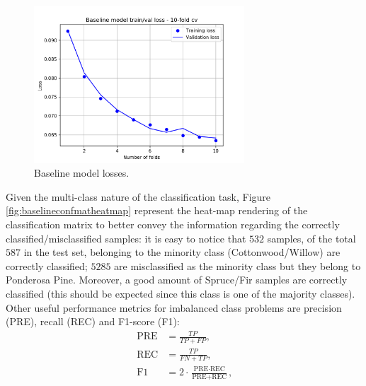 \begin{figure}
\centering
\includegraphics[width=0.7\textwidth]{./TeX_files/img/baselinemodelloss.png}
\caption{Baseline model losses.}
\label{fig:baselinemodelloss}
\end{figure}
Given the multi-class nature of the classification task, Figure \ref{fig:baselineconfmatheatmap} represent the heat-map rendering of the classification matrix to better convey the information regarding the correctly classified/misclassified samples: it is easy to notice that $532$ samples, of the total $587$ in the test set, belonging to the minority class (Cottonwood/Willow) are correctly classified; $5285$ are misclassified as the minority class but they belong to Ponderosa Pine. Moreover, a good amount of Spruce/Fir samples are correctly classified (this should be expected since this class is one of the majority classes). Other useful performance metrics for imbalanced class problems are precision (PRE), recall (REC) and F1-score (F1):
\begin{equation}
\begin{aligned}
\text{PRE} &= \frac{TP}{TP+FP}\text{,} \\
\text{REC} &= \frac{TP}{FN+TP}\text{,} \\
\text{F1} &= 2 \cdot \frac{\text{PRE} \cdot \text{REC}}{\text{PRE} + \text{REC}}\text{,}
\end{aligned}
\end{equation}
